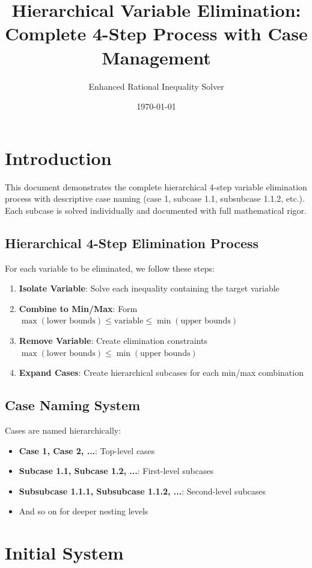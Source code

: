 \documentclass{article}
\title{Hierarchical Variable Elimination: Complete 4-Step Process with Case Management}
\author{Enhanced Rational Inequality Solver}
\date{\today}
\begin{document}
\maketitle

\section{Introduction}

This document demonstrates the complete hierarchical 4-step variable elimination process
with descriptive case naming (case 1, subcase 1.1, subsubcase 1.1.2, etc.). Each subcase
is solved individually and documented with full mathematical rigor.

\subsection{Hierarchical 4-Step Elimination Process}

For each variable to be eliminated, we follow these steps:
\begin{enumerate}
\item \textbf{Isolate Variable}: Solve each inequality containing the target variable
\item \textbf{Combine to Min/Max}: Form $\max(\text{lower bounds}) \leq \text{variable} \leq \min(\text{upper bounds})$
\item \textbf{Remove Variable}: Create elimination constraints $\max(\text{lower bounds}) \leq \min(\text{upper bounds})$
\item \textbf{Expand Cases}: Create hierarchical subcases for each min/max combination
\end{enumerate}

\subsection{Case Naming System}

Cases are named hierarchically:
\begin{itemize}
\item \textbf{Case 1, Case 2, ...}: Top-level cases
\item \textbf{Subcase 1.1, Subcase 1.2, ...}: First-level subcases
\item \textbf{Subsubcase 1.1.1, Subsubcase 1.1.2, ...}: Second-level subcases
\item And so on for deeper nesting levels
\end{itemize}

\section{Initial System}
\end{document}
